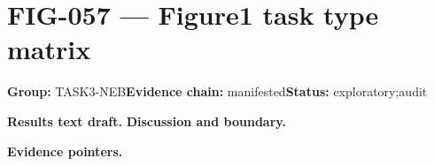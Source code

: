 \clearpage
\section{FIG-057 --- Figure1 task type matrix}
\label{figpage:fig-057}
\textbf{Group:} TASK3-NEB\quad \textbf{Evidence chain:} manifested\quad \textbf{Status:} exploratory;audit

\textbf{Results text draft.} 
\textbf{Discussion and boundary.} 


\textbf{Evidence pointers.}



\vfill
